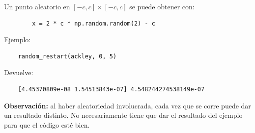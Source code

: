 \documentclass{article}
\begin{document}
\begin{enumerate}
    Un punto aleatorio en $[-c,c]\times[-c,c]$ se puede obtener con:
    \begin{verbatim}
        x = 2 * c * np.random.random(2) - c
    \end{verbatim}
    
    Ejemplo:
    \begin{verbatim}
    random_restart(ackley, 0, 5)
    \end{verbatim}
    Devuelve:
    \begin{verbatim}
    [4.45370809e-08 1.54513843e-07] 4.548244274538149e-07
    \end{verbatim}
    
    \textbf{Observación:} al haber aleatoriedad involucrada, cada vez que se corre puede dar un resultado distinto. No necesariamente tiene que dar el resultado del ejemplo para que el código esté bien.
\end{enumerate}
\end{document}
